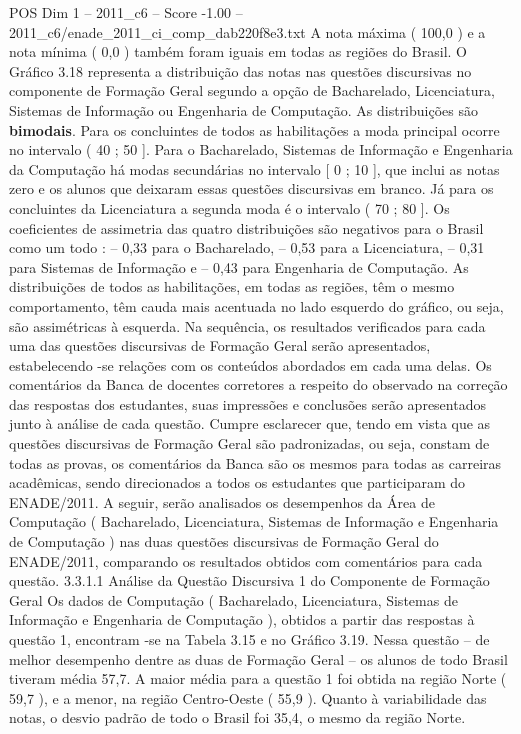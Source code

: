 \begin{textsample}{POS Dim 1 – 2011\_c6 – Score -1.00 – 2011\_c6/enade\_2011\_ci\_comp\_dab220f8e3.txt}
A nota máxima ( 100,0 ) e a nota mínima ( 0,0 ) também foram iguais em todas as regiões do Brasil.
O Gráfico 3.18 representa a distribuição das notas nas questões discursivas no componente de Formação Geral segundo a opção de Bacharelado, Licenciatura, Sistemas de Informação ou Engenharia de Computação.
As distribuições são \textbf{bimodais}.
Para os concluintes de todos as habilitações a moda principal ocorre no intervalo ( 40 ; 50 ].
Para o Bacharelado, Sistemas de Informação e Engenharia da Computação há modas secundárias no intervalo [ 0 ; 10 ], que inclui as notas zero e os alunos que deixaram essas questões discursivas em branco.
Já para os concluintes da Licenciatura a segunda moda é o intervalo ( 70 ; 80 ].
Os coeficientes de assimetria das quatro distribuições são negativos para o Brasil como um todo : – 0,33 para o Bacharelado, – 0,53 para a Licenciatura, – 0,31 para Sistemas de Informação e – 0,43 para Engenharia de Computação.
As distribuições de todos as habilitações, em todas as regiões, têm o mesmo comportamento, têm cauda mais acentuada no lado esquerdo do gráfico, ou seja, são assimétricas à esquerda.
Na sequência, os resultados verificados para cada uma das questões discursivas de Formação Geral serão apresentados, estabelecendo -se relações com os conteúdos abordados em cada uma delas.
Os comentários da Banca de docentes corretores a respeito do observado na correção das respostas dos estudantes, suas impressões e conclusões serão apresentados junto à análise de cada questão.
Cumpre esclarecer que, tendo em vista que as questões discursivas de Formação Geral são padronizadas, ou seja, constam de todas as provas, os comentários da Banca são os mesmos para todas as carreiras acadêmicas, sendo direcionados a todos os estudantes que participaram do ENADE/2011.
A seguir, serão analisados os desempenhos da Área de Computação ( Bacharelado, Licenciatura, Sistemas de Informação e Engenharia de Computação ) nas duas questões discursivas de Formação Geral do ENADE/2011, comparando os resultados obtidos com comentários para cada questão. 3.3.1.1 Análise da Questão Discursiva 1 do Componente de Formação Geral Os dados de Computação ( Bacharelado, Licenciatura, Sistemas de Informação e Engenharia de Computação ), obtidos a partir das respostas à questão 1, encontram -se na Tabela 3.15 e no Gráfico 3.19.
Nessa questão – de melhor desempenho dentre as duas de Formação Geral – os alunos de todo Brasil tiveram média 57,7.
A maior média para a questão 1 foi obtida na região Norte ( 59,7 ), e a menor, na região Centro-Oeste ( 55,9 ).
Quanto à variabilidade das notas, o desvio padrão de todo o Brasil foi 35,4, o mesmo da região Norte.

\end{textsample}
